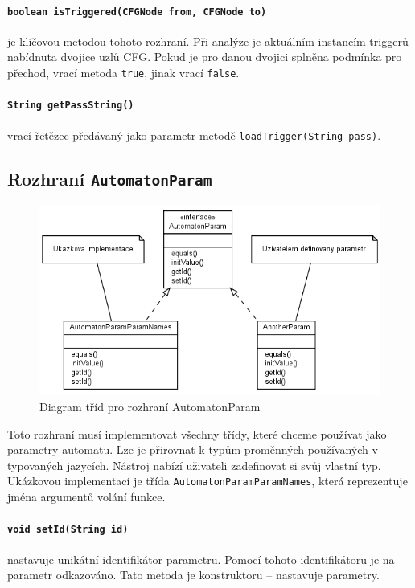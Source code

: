 \documentclass[11pt,final,oneside]{fithesis}
\begin{document}
\paragraph{\texttt{boolean isTriggered(CFGNode from, CFGNode to)}} je klíčovou metodou tohoto rozhraní. Při analýze je aktuálním instancím triggerů nabídnuta dvojice uzlů CFG. Pokud je pro danou dvojici splněna podmínka pro přechod, vrací metoda {\tt true}, jinak vrací {\tt false}.  

\paragraph{\texttt{String getPassString()}} vrací řetězec předávaný jako parametr metodě {\tt loadTrigger(String pass)}. 


\subsection[AutomatonParam]{Rozhraní \texttt{AutomatonParam}}\label{interface-param}

\begin{figure}[ht]
\begin{center}
\ifpdf
	\includegraphics[width=12cm]{img/param.png}
\fi
\end{center}
\caption{Diagram tříd pro rozhraní AutomatonParam}
\label{param-classdiagram}
\end{figure}

Toto rozhraní musí implementovat všechny třídy, které chceme používat jako parametry automatu. Lze je přirovnat k typům proměnných používaných v typovaných jazycích. Nástroj nabízí uživateli zadefinovat si svůj vlastní typ. Ukázkovou implementací je třída {\tt AutomatonParamParamNames}, která reprezentuje jména argumentů volání funkce.

\paragraph{\texttt{void setId(String id)}} nastavuje unikátní identifikátor parametru. Pomocí tohoto identifikátoru je na parametr odkazováno. Tato metoda je  konstruktoru -- nastavuje parametry.
\end{document}
